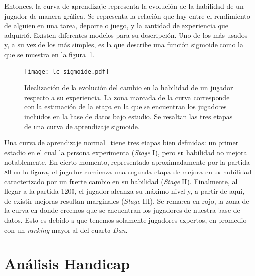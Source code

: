 \documentclass[11pt,twoside,spanish]{report} %
\begin{document}
Entonces, la curva de aprendizaje representa la evoluci\'on de la habilidad de un jugador de manera gr\'afica.
Se representa la relaci\'on que hay entre el rendimiento de alguien en una tarea, deporte o juego, y la cantidad de experiencia que adquiri\'o.
Existen diferentes modelos para su descripci\'on.
Uno de los m\'as usados y, a su vez de los m\'as simples, es la que describe una funci\'on sigmoide como la que se muestra en la figura~\ref{fig:lc_sigmoide}.

\begin{figure}[H]
	\centering
	\texttt{[image: lc\_sigmoide.pdf]}
	\caption{Idealizaci\'on de la evoluci\'on del cambio en la habilidad de un jugador respecto a su experiencia. La zona marcada de la curva corresponde con la estimaci\'on de la etapa en la que se encuentran los jugadores incluidos en la base de datos bajo estudio.
	Se resaltan las tres etapas de una curva de aprendizaje sigmoide.}
	\label{fig:lc_sigmoide}
\end{figure}


Una curva de aprendizaje normal~\cite{newell1981-skillAcquisitionAndLawOfPractice} tiene tres etapas bien definidas: un primer estadio en el cual la persona experimenta (\textit{Stage} I), pero su habilidad no mejora notablemente.
En cierto momento, representado aproximadamente por la partida 80 en la figura, el jugador comienza una segunda etapa de mejora en su habilidad caracterizado por un fuerte cambio en su habilidad (\textit{Stage} II).
Finalmente, al llegar a la partida 1200, el jugador alcanza su m\'aximo nivel y, a partir de aqu\'i, de existir mejoras resultan marginales (\textit{Stage} III).
Se remarca en rojo, la zona de la curva en donde creemos que se encuentran los jugadores de nuestra base de datos.
Esto es debido a que tenemos solamente jugadores expertos, en promedio con un \textit{ranking} mayor al del cuarto \textit{Dan}.




\section{An\'alisis Handicap}
\label{chap:handicap}

\end{document}
